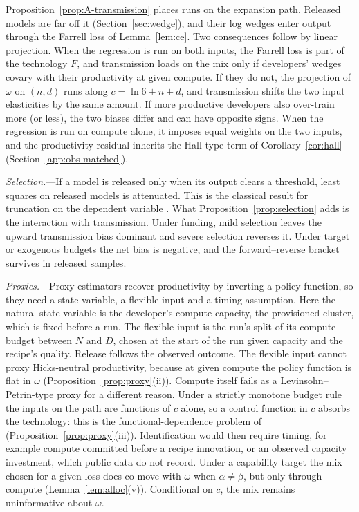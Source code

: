 Proposition~\ref{prop:A-transmission} places runs on the expansion path. Released models are far off it
(Section~\ref{sec:wedge}), and their log wedges enter output through the Farrell loss of Lemma~\ref{lem:ce}. Two
consequences follow by linear projection. When the regression is run on both inputs, the Farrell loss is part of the
technology $F$, and transmission loads on the mix only if developers' wedges covary with their productivity at given
compute. If they do not, the projection of $\omega$ on $(n,d)$ runs along $c=\ln6+n+d$, and transmission shifts the
two input elasticities by the same amount. If more productive developers also over-train more (or less), the two
biases differ and can have opposite signs. When the regression is run on compute alone, it imposes equal weights on
the two inputs, and the productivity residual inherits the Hall-type term of Corollary~\ref{cor:hall}
(Section~\ref{app:obs-matched}).

\emph{Selection.}---If a model is released only when its output clears a threshold, least squares on released models is
attenuated. This is the classical result for truncation on the dependent variable
\citep{goldberger1981linear,hausman1977social}. What Proposition~\ref{prop:selection} adds is the interaction with
transmission. Under funding, mild selection leaves the upward transmission bias dominant and severe selection reverses
it. Under target or exogenous budgets the net bias is negative, and the forward--reverse bracket survives in released
samples.

\emph{Proxies.}---Proxy estimators \citep{olley1996dynamics,levinsohn2003estimating,ackerberg2015identification} recover
productivity by inverting a policy function, so they need a state variable, a flexible input and a timing assumption.
Here the natural state variable is the developer's compute capacity, the provisioned cluster, which is fixed before a
run. The flexible input is the run's split of its compute budget between $N$ and $D$, chosen at the start of the run
given capacity and the recipe's quality. Release follows the observed outcome. The flexible input cannot proxy
Hicks-neutral productivity, because at given compute the policy function is flat in $\omega$
(Proposition~\ref{prop:proxy}(ii)). Compute itself fails as a Levinsohn--Petrin-type proxy for a different reason.
Under a strictly monotone budget rule the inputs on the path are functions of $c$ alone, so a control function in $c$
absorbs the technology: this is the functional-dependence problem of \citet{ackerberg2015identification}
(Proposition~\ref{prop:proxy}(iii)). Identification would then require timing, for example compute committed before a
recipe innovation, or an observed capacity investment, which public data do not record. Under a capability target the
mix chosen for a given loss does co-move with $\omega$ when $\alpha\neq\beta$, but only through compute
(Lemma~\ref{lem:alloc}(v)). Conditional on $c$, the mix remains uninformative about $\omega$.

